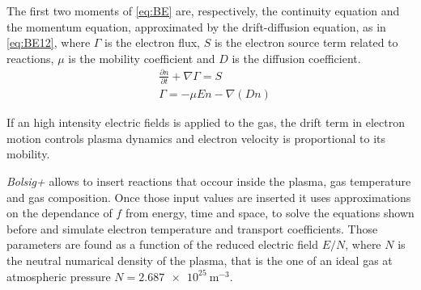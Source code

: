 The first two moments of \ref{eq:BE} are, respectively, the continuity equation and the momentum equation, approximated by the drift-diffusion equation, as in \ref{eq:BE12}, where $\Gamma$ is the electron flux, $S$ is the electron source term related to reactions, $\mu$ is the mobility coefficient and $D$ is the diffusion coefficient.
\begin{equation}
 \begin{split}
 &\frac{\partial n}{\partial t} + \nabla \Gamma = S \\
 &\Gamma = -\mu E n - \nabla (D n)
 \end{split}
 \label{eq:BE12}
\end{equation}

If an high intensity electric fields is applied to the gas, the drift term in electron motion controls plasma dynamics and electron velocity is proportional to its mobility.

\emph{Bolsig+} allows to insert reactions that occour inside the plasma, gas temperature and gas composition. Once those input values are inserted it uses approximations on the dependance of $f$ from energy, time and space, to solve the equations shown before and simulate electron temperature and transport coefficients. Those parameters are found as a function of the reduced electric field $E/N$, where $N$ is the neutral numarical density of the plasma, that is the one of an ideal gas at atmospheric pressure $N = \SI{2.687e25}{\meter^{-3}}$.

